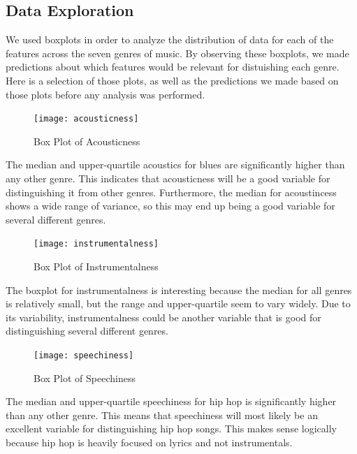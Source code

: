 \documentclass[11pt, a4paper, twocolumn]{article}
\begin{document}
\subsection{Data Exploration}
We used boxplots in order to analyze the distribution of data for each of the features across the seven genres of music. By observing these boxplots, we made predictions about which features would be relevant for distuishing each genre. Here is a selection of those plots, as well as the predictions we made based on those plots before any analysis was performed.
\begin{figure}[htb!]
\texttt{[image: acousticness]}
\caption{Box Plot of Acousticness}
\end{figure}
The median and upper-quartile acoustics for blues are significantly higher than any other genre. This indicates that acousticness will be a good variable for distinguishing it from other genres. Furthermore, the median for acoustincess shows a wide range of variance, so this may end up being a good variable for several different genres.
\begin{figure}[htb!]
\texttt{[image: instrumentalness]}
\caption{Box Plot of Instrumentalness}
\end{figure}
The boxplot for instrumentalness is interesting because the median for all genres is relatively small, but the range and upper-quartile seem to vary widely. Due to its variability, instrumentalness could be another variable that is good for distinguishing several different genres.
\begin{figure}[htb!]
\texttt{[image: speechiness]}
\caption{Box Plot of Speechiness}
\end{figure}
The median and upper-quartile speechiness for hip hop is significantly higher than any other genre. This means that speechiness will most likely be an excellent variable for distinguishing hip hop songs. This makes sense logically because hip hop is heavily focused on lyrics and not instrumentals.
\end{document}
